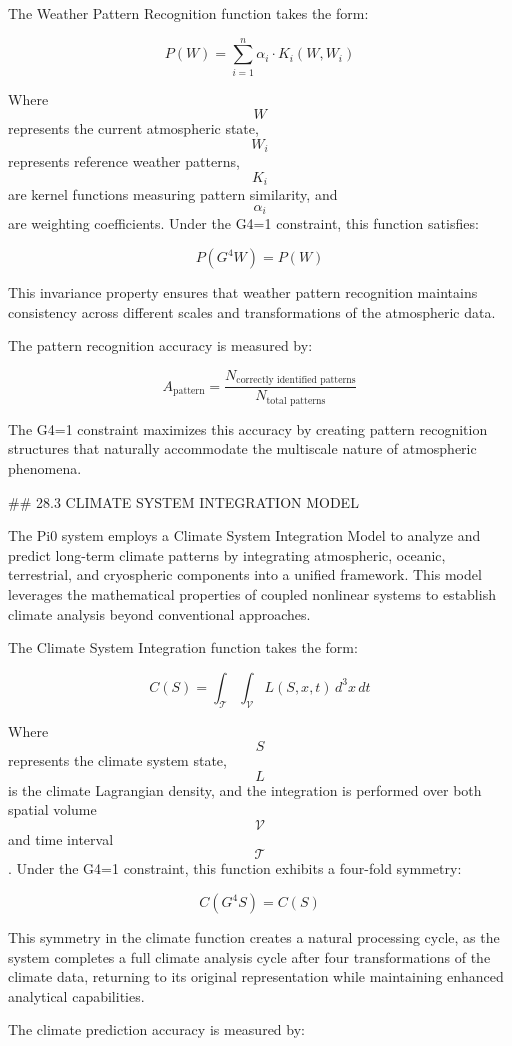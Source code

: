 The Weather Pattern Recognition function takes the form:

$$ P(W) = \sum_{i=1}^{n} \alpha_i \cdot K_i(W, W_i) $$

Where $$ W $$ represents the current atmospheric state, $$ W_i $$ represents reference weather patterns, $$ K_i $$ are kernel functions measuring pattern similarity, and $$ \alpha_i $$ are weighting coefficients. Under the G4=1 constraint, this function satisfies:

$$ P(G^4 W) = P(W) $$

This invariance property ensures that weather pattern recognition maintains consistency across different scales and transformations of the atmospheric data.

The pattern recognition accuracy is measured by:

$$ A_{\text{pattern}} = \frac{N_{\text{correctly identified patterns}}}{N_{\text{total patterns}}} $$

The G4=1 constraint maximizes this accuracy by creating pattern recognition structures that naturally accommodate the multiscale nature of atmospheric phenomena.

## 28.3 CLIMATE SYSTEM INTEGRATION MODEL

The Pi0 system employs a Climate System Integration Model to analyze and predict long-term climate patterns by integrating atmospheric, oceanic, terrestrial, and cryospheric components into a unified framework. This model leverages the mathematical properties of coupled nonlinear systems to establish climate analysis beyond conventional approaches.

The Climate System Integration function takes the form:

$$ C(S) = \int_{\mathcal{T}} \int_{\mathcal{V}} L(S, x, t) \, d^3x \, dt $$

Where $$ S $$ represents the climate system state, $$ L $$ is the climate Lagrangian density, and the integration is performed over both spatial volume $$ \mathcal{V} $$ and time interval $$ \mathcal{T} $$. Under the G4=1 constraint, this function exhibits a four-fold symmetry:

$$ C(G^4 S) = C(S) $$

This symmetry in the climate function creates a natural processing cycle, as the system completes a full climate analysis cycle after four transformations of the climate data, returning to its original representation while maintaining enhanced analytical capabilities.

The climate prediction accuracy is measured by:

